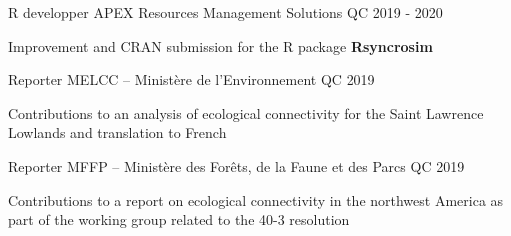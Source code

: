 \vspace{-6pt}

\begin{cventries}

    \cventry
    {R developper} %
    {APEX Resources Management Solutions} %
    {QC} %
    {2019 - 2020} %
    {
      \begin{cvitems} %
        \item {Improvement and CRAN submission for the R package \textbf{Rsyncrosim}}
      \end{cvitems}
    }

    \cventry
    {Reporter} %
    {MELCC – Ministère de l'Environnement} %
    {QC} %
    {2019} %
    {
      \begin{cvitems} %
        \item {Contributions to an analysis of ecological connectivity for the Saint Lawrence Lowlands and translation to French}
      \end{cvitems}
    }

    \cventry
    {Reporter} %
    {MFFP – Ministère des Forêts, de la Faune et des Parcs} %
    {QC} %
    {2019} %
    {
      \begin{cvitems} %
        \item {Contributions to a report on ecological connectivity in the northwest America as part of the working group related to the 40-3 resolution}
      \end{cvitems}
    }
  
\end{cventries}